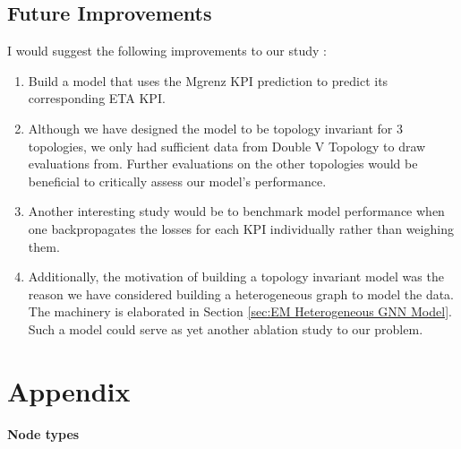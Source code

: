 \documentclass{report} %
\begin{document}
\section{Future Improvements}\label{sec:Future Improvements}

I would suggest the following improvements to our study : 

\begin{enumerate}
    \item Build a model that uses the Mgrenz \ac{KPI} prediction to predict its corresponding ETA \ac{KPI}. 
    \item Although we have designed the model to be topology invariant for 3 topologies, we only had sufficient data from Double V Topology to draw evaluations from.
    Further evaluations on the other topologies would be beneficial to critically assess our model's performance.
    \item Another interesting study would be to benchmark model performance when one backpropagates the losses for each \ac{KPI} individually rather than weighing them.
    \item Additionally, the motivation of building a topology invariant model was the reason we have considered building a heterogeneous graph to model the data. The machinery is elaborated in Section \ref{sec:EM Heterogeneous GNN Model}.
    Such a model could serve as yet another ablation study to our problem.
\end{enumerate}

\newpage 

\newpage 

\chapter*{Appendix}
\textbf{Node types}
\end{document}

